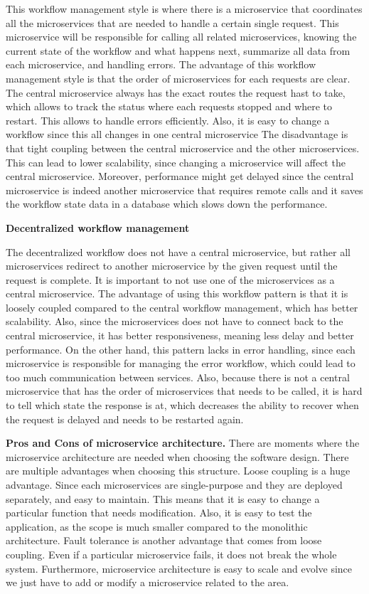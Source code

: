 This workflow management style is where there is a microservice that coordinates all the microservices that are needed to handle a certain single request. This microservice will be responsible for calling all related microservices, knowing the current state of the workflow and what happens next, summarize all data from each microservice, and handling errors. 
The advantage of this workflow management style is that the order of microservices for each requests are clear. The central microservice always has the exact routes the request hast to take, which allows to track the status where each requests stopped and where to restart. This allows to handle errors efficiently. Also, it is easy to change a workflow since this all changes in one central microservice
The disadvantage is that tight coupling between the central microservice and the other microservices. This can lead to lower scalability, since changing a microservice will affect the central microservice. Moreover, performance might get delayed since the central microservice is indeed another microservice that requires remote calls and it saves the workflow state data in a database which slows down the performance. 

\noindent \textbf{Decentralized workflow management}	

The decentralized workflow does not have a central microservice, but rather all microservices redirect to another microservice 
by the given request until the request is complete. It is important to not use one of the microservices as a central microservice.
The advantage of using this workflow pattern is that it is loosely coupled compared to the central workflow management, 
which has better scalability. Also, since the microservices does not have to connect back to the central microservice, 
it has better responsiveness, meaning less delay and better performance. 
On the other hand, this pattern lacks in error handling, since each microservice is responsible for managing the error workflow, 
which could lead to too much communication between services. Also, because there is not a central microservice that has the order 
of microservices that needs to be called, it is hard to tell which state the response is at, which decreases the ability to recover 
when the request is delayed and needs to be restarted again. 

\noindent \textbf{Pros and Cons of microservice architecture.}
There are moments where the microservice architecture are needed when choosing the software design. There are multiple advantages when choosing this structure. Loose coupling is a huge advantage. Since each microservices are single-purpose and they are deployed separately, and easy to maintain. This means that it is easy to change a particular function that needs modification. Also, it is easy to test the application, as the scope is much smaller compared to the monolithic architecture. Fault tolerance is another advantage that comes from loose coupling. Even if a particular microservice fails, it does not break the whole system. Furthermore, microservice architecture is easy to scale and evolve since we just have to add or modify a microservice related to the area. 

